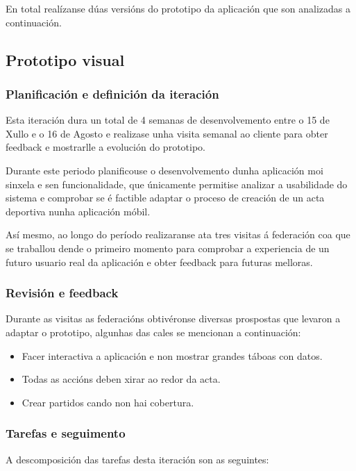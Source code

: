   En total realízanse dúas versións do prototipo da aplicación que son 
analizadas a continuación.

    \subsection{Prototipo visual}

      \subsubsection{Planificación e definición da iteración}
      Esta iteración dura un total de 4 semanas de desenvolvemento entre o 15 
de Xullo e o 16 de Agosto e realizase unha visita semanal ao cliente para obter 
feedback e mostrarlle a evolución do prototipo.

      Durante este periodo planificouse o desenvolvemento dunha aplicación moi 
sinxela e sen funcionalidade, que únicamente permitise analizar a usabilidade do 
sistema e comprobar se é factible adaptar o proceso de creación de un acta 
deportiva nunha aplicación móbil.

    Así mesmo, ao longo do período realizaranse ata tres visitas á federación 
coa que se traballou dende o primeiro momento para comprobar a experiencia de 
un futuro usuario real da aplicación e obter feedback para futuras melloras.

      \subsubsection{Revisión e feedback}
      Durante as visitas as federacións obtivéronse diversas prospostas que 
levaron a adaptar o prototipo, algunhas das cales se mencionan a continuación:

      \begin{itemize}
        \item Facer interactiva a aplicación e non mostrar grandes táboas con 
datos.
        \item Todas as accións deben xirar ao redor da acta.
        \item Crear partidos cando non hai cobertura.
      \end{itemize}

      \subsubsection{Tarefas e seguimento}

      A descomposición das tarefas desta iteración son as seguintes:

